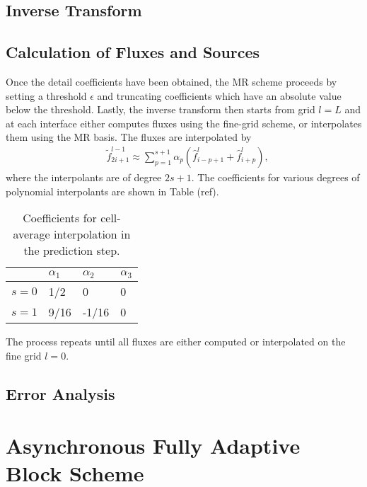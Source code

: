 \documentclass[12pt,letterpaper]{article}
\begin{document}
    \subsection*{Inverse Transform}

        
    \subsection*{Calculation of Fluxes and Sources}
        Once the detail coefficients have been obtained, the MR scheme
        proceeds by setting a threshold $\epsilon$ and truncating coefficients
        which have an absolute value below the threshold. Lastly, the inverse
        transform then starts from grid $l=L$ and at each interface either
        computes fluxes using the fine-grid scheme, or interpolates them using
        the MR basis. The fluxes are interpolated by
        \begin{align}
            & \tilde{f}_{2i+1}^{l-1} \approx \sum_{p=1}^{s+1} \alpha_{p} \left(
            \hat{f}^{l}_{i-p+1} + \hat{f}^{l}_{i+p} \right),
        \end{align}
        where the interpolants are of degree $2s+1$. The coefficients for
        various degrees of polynomial interpolants are shown in Table (ref).
        \begin{table}
            \centering
            \begin{tabular}{|l|l|l|l|}
            \hline
                & $\alpha_{1}$ & $\alpha_{2}$ & $\alpha_{3}$ \\ \hline
                $s=0$ & 1/2 & 0 & 0 \\ \hline
                $s=1$ & 9/16 & -1/16 & 0 \\ \hline
            \end{tabular}
            \caption{Coefficients for cell-average interpolation in the prediction step.}
        \end{table}
        The process repeats until all fluxes are either computed or
        interpolated on the fine grid $l=0$.

        \subsection*{Error Analysis}


\section{Asynchronous Fully Adaptive Block Scheme}
\end{document}
